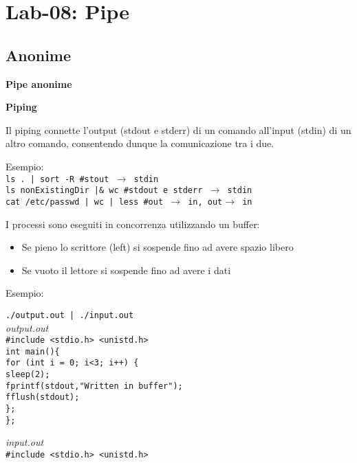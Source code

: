 \section{Lab-08: Pipe}
\subsection{Anonime}
\begin{flushleft}
  \textbf{Pipe anonime}
  \begin{flushleft}
    \textbf{Piping}\par 
    Il piping connette l'output (stdout e stderr) di un comando all'input (stdin) di un 
    altro comando, consentendo dunque la comunicazione tra i due. \\
    \begin{flushleft}
      Esempio: \\
      \texttt{ls . | sort -R \#stout $\rightarrow$ stdin\\
      ls nonExistingDir |\& wc \#stdout e stderr $\rightarrow$ stdin\\
      cat /etc/passwd | wc | less \#out $\rightarrow$ in, out$\rightarrow$ in}
    \end{flushleft}
    I processi sono eseguiti in concorrenza utilizzando un buffer: 
    \begin{itemize}
      \item Se pieno lo scrittore (left) si sospende fino ad avere spazio libero
      \item Se vuoto il lettore si sospende fino ad avere i dati
    \end{itemize}
    Esempio:
    \begin{flushleft}
      \texttt{./output.out | ./input.out}\\
      \textit{output.out}\\
      \texttt{\#include <stdio.h> <unistd.h>\\
              int main()\{ \\
              \halftab for (int i = 0; i<3; i++) \{\\
              \tab sleep(2);\\
              \tab fprintf(stdout,"Written in buffer");\\
              \tab fflush(stdout);\\
              \halftab \};\\ \};}\par
      \textit{input.out}\\
      \texttt{\#include <stdio.h> <unistd.h>\\
}
\end{flushleft}
\end{flushleft}
\end{flushleft}
